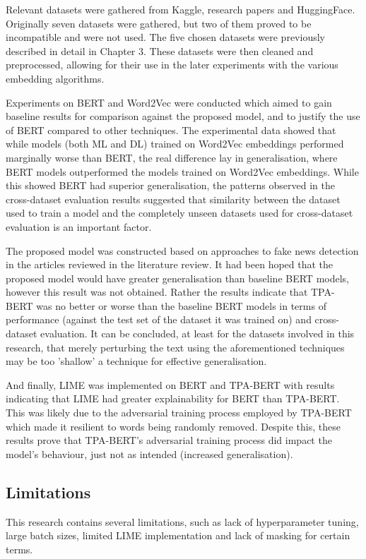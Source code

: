 \documentclass[stu,12pt,floatsintext,donotrepeattitle]{apa7}
\begin{document}
Relevant datasets were gathered from Kaggle, research papers and HuggingFace. Originally seven datasets were gathered, but two of them proved to be incompatible and were not used. The five chosen datasets were previously described in detail in Chapter 3. These datasets were then cleaned and preprocessed, allowing for their use in the later experiments with the various embedding algorithms.

Experiments on BERT and Word2Vec were conducted which aimed to gain baseline results for comparison against the proposed model, and to justify the use of BERT compared to other techniques. The experimental data showed that while models (both ML and DL) trained on Word2Vec embeddings performed marginally worse than BERT, the real difference lay in generalisation, where BERT models outperformed the models trained on Word2Vec embeddings. While this showed BERT had superior generalisation, the patterns observed in the cross-dataset evaluation results suggested that similarity between the dataset used to train a model and the completely unseen datasets used for cross-dataset evaluation is an important factor. 

The proposed model was constructed based on approaches to fake news detection in the articles reviewed in the literature review. It had been hoped that the proposed model would have greater generalisation than baseline BERT models, however this result was not obtained. Rather the results indicate that TPA-BERT was no better or worse than the baseline BERT models in terms of performance (against the test set of the dataset it was trained on) and cross-dataset evaluation. It can be concluded, at least for the datasets involved in this research, that merely perturbing the text using the aforementioned techniques may be too 'shallow' a technique for effective generalisation. 

And finally, LIME was implemented on BERT and TPA-BERT with results indicating that LIME had greater explainability for BERT than TPA-BERT. This was likely due to the adversarial training process employed by TPA-BERT which made it resilient to words being randomly removed. Despite this, these results prove that TPA-BERT's adversarial training process did impact the model's behaviour, just not as intended (increased generalisation).

\subsection{Limitations}
This research contains several limitations, such as lack of hyperparameter tuning, large batch sizes, limited LIME implementation and lack of masking for certain terms.
\end{document}

